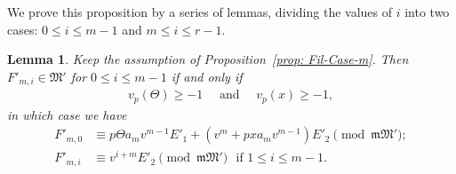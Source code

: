 \documentclass[11pt]{amsart}
\theoremstyle{definition}
\numberwithin{equation}{subsection}
\theoremstyle{plain}
\theoremstyle{plain}
\theoremstyle{plain}
\theoremstyle{plain}
\theoremstyle{plain}
\theoremstyle{plain}
\theoremstyle{plain}
\theoremstyle{plain}
\theoremstyle{plain}
\newtheorem{lemm}[equation]{Lemma}
\theoremstyle{plain}
\theoremstyle{plain}
\theoremstyle{plain}
\theoremstyle{definition}
\theoremstyle{definition}
\theoremstyle{definition}
\theoremstyle{remark}
\renewcommand{\(}{\textup{(}}
\renewcommand{\)}{\textup{)}}
\newcommand{\fM}{\mathfrak{M}}
\newcommand{\fm}{\mathfrak{m}}
\begin{document}
We prove this proposition by a series of lemmas, dividing the values of $i$ into two cases: $0\leq i\leq m-1$ and $m\leq i\leq r-1$.

\begin{lemm}\label{lemma k=m r=2m, 0 leq i leq m-1}
Keep the assumption of Proposition~\ref{prop: Fil-Case-m}. Then $F'_{m,i}\in\fM'$ for $0\leq i\leq m-1$ if and only if
\begin{align*}
    v_p(\Theta)\geq -1  \quad\mbox{ and }\quad v_p(x)\geq -1,
\end{align*}
in which case we have
\begin{align*}
F'_{m,0} &\equiv  p\Theta a_mv^{m-1}E'_1 +(v^m+pxa_mv^{m-1})E'_2  \pmod{\fm\fM'};
    \\
F'_{m,i} &\equiv  v^{i+m}E'_2 \pmod{\fm\fM'}\,\,\mbox{ if }1\leq i\leq m-1.
\end{align*}
\end{lemm}
\end{document}
